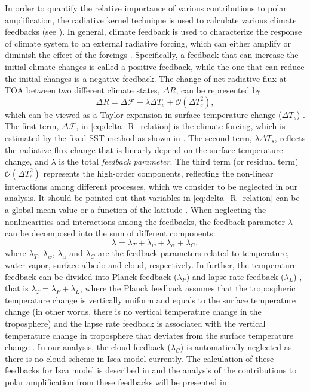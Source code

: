 In order to quantify the relative importance of various contributions to polar amplification, the radiative kernel technique \citep{Soden2008,Shell2008} is used to calculate various climate feedbacks (see ). In general, climate feedback is used to characterize the response of climate system to an external radiative forcing, which can either amplify or diminish the effect of the forcings \citep{Hansen1984}. Specifically, a feedback that can increase the initial climate changes is called a positive feedback, while the one that can reduce the initial changes is a negative feedback. The change of net radiative flux at TOA between two different climate states, $\Delta R$, can be represented by
\begin{equation}
\Delta R = \Delta \mathscr{F}+\lambda \Delta T_s + \mathcal{O}\left( \Delta T_s^2 \right),
\label{eq:delta_R_relation}
\end{equation}
which can be viewed as a Taylor expansion in surface temperature change ($\Delta T_s$) \citep{Feldl2013a}. The first term, $\Delta \mathscr{F}$, in \eqref{eq:delta_R_relation} is the climate forcing, which is estimated by the fixed-SST method \citep{Hansen2005, Feldl2013a, Kim2018} as shown in . The second term,  $\lambda \Delta T_s$, reflects the radiative flux change that is linearly depend on the surface temperature change, and $\lambda$ is the total \textit{feedback parameter}. The third term (or residual term) $ \mathcal{O}\left( \Delta T_s^2 \right)$ represents the high-order components, reflecting the non-linear interactions among different processes, which we consider to be neglected in our analysis. It should be pointed out that variables in \eqref{eq:delta_R_relation} can be a global mean value or a function of the latitude \citep{Feldl2013a}. When neglecting the nonlinearities and interactions among the feedbacks, the feedback parameter $\lambda$ can be decomposed into the sum of different components:
\begin{equation}
\lambda=\lambda_T+\lambda_{w} +\lambda_\alpha+\lambda_C,
\label{eq:fb_decmop}
\end{equation}
where $\lambda_T$, $\lambda_{w}$, $\lambda_\alpha$ and $\lambda_C$ are the feedback parameters related to temperature, water vapor, surface albedo and cloud, respectively. In further, the temperature feedback can be divided into Planck feedback ($\lambda_P$) and lapse rate  feedback ($\lambda_L$) \citep{Soden2006}, that is $\lambda_T=\lambda_P+\lambda_L$, where the Planck feedback assumes that the tropospheric temperature change is vertically uniform and equals to the surface temperature change (in other words, there is no vertical temperature change in the troposphere) and the lapse rate feedback is associated with the vertical temperature change in troposphere that deviates from the surface temperature change \citep{Bony2006,Soden2006,Feldl2017}. In our analysis, the cloud feedback ($\lambda_C$) is automatically neglected as there is no cloud scheme in Isca model currently. The calculation of these feedbacks for Isca model is described in  and the analysis of the contributions to polar amplification from these feedbacks will be presented in .


